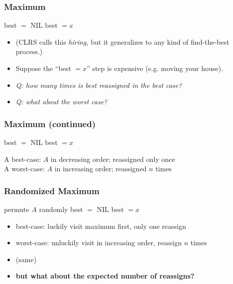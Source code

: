 \documentclass[10pt]{beamer}
\begin{document}
\begin{frame} \frametitle{Maximum}
  {\footnotesize
  \begin{algorithmic}[1]
    \State best $ = $ NIL
        \State best $= x$
      \EndIf
    \EndFor
    \State {}
    \EndFunction
  \end{algorithmic}
  }
  \begin{itemize}
  \item (CLRS calls this \emph{hiring,} but it generalizes to any kind of find-the-best process.)
  \item Suppose the ``best $= x$'' step is expensive (e.g. moving your house).
  \item \emph{Q: how many times is best reassigned in the best case?}
  \item \emph{Q: what about the worst case?}
\end{itemize}
\end{frame}

\begin{frame} \frametitle{Maximum (continued)}
  {\footnotesize
  \begin{algorithmic}[1]
    \State best $ = $ NIL
        \State best $= x$
      \EndIf
    \EndFor
    \State {}
    \EndFunction
  \end{algorithmic}
  }
\vspace{.5cm}
A best-case: $A$ in decreasing order; reassigned only once \\
\vspace{.5cm}
A worst-case: $A$ in increasing order; reassigned $n$ times
\end{frame}

\begin{frame} \frametitle{Randomized Maximum}
  {\footnotesize
  \begin{algorithmic}[1]
    \State permute $A$ randomly 
    \State best $ = $ NIL
        \State best $= x$
      \EndIf
    \EndFor
    \State {}
    \EndFunction
  \end{algorithmic}
  }
  \begin{itemize}
    \item best-case: luckily visit maximum first, only one reassign
    \item worst-case: unluckily visit in increasing order, reassign $n$ times
    \item (same)
    \item \textbf{but what about the expected number of reassigns?}
  \end{itemize}
\end{frame}
\end{document}

